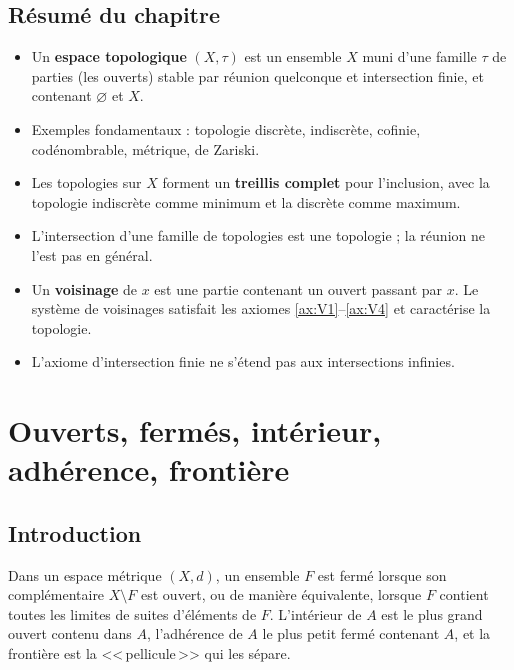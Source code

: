 \documentclass[12pt,a4paper,openany]{book}
\theoremstyle{definition}
\theoremstyle{cours}
\theoremstyle{coursnormal}
\begin{document}
\section*{Résumé du chapitre}

\begin{itemize}
  \item Un \textbf{espace topologique} $(X,\tau)$ est un ensemble $X$ muni d'une famille $\tau$ de parties (les ouverts) stable par réunion quelconque et intersection finie, et contenant $\varnothing$ et $X$.
  \item Exemples fondamentaux : topologie discrète, indiscrète, cofinie, codénombrable, métrique, de Zariski.
  \item Les topologies sur $X$ forment un \textbf{treillis complet} pour l'inclusion, avec la topologie indiscrète comme minimum et la discrète comme maximum.
  \item L'intersection d'une famille de topologies est une topologie ; la réunion ne l'est pas en général.
  \item Un \textbf{voisinage} de $x$ est une partie contenant un ouvert passant par $x$. Le système de voisinages satisfait les axiomes \ref{ax:V1}--\ref{ax:V4} et caractérise la topologie.
  \item L'axiome d'intersection finie ne s'étend pas aux intersections infinies.
\end{itemize}

\chapter{Ouverts, fermés, intérieur, adhérence, frontière}
\label{chap:ouverts-fermes}

\section*{Introduction}

Dans un espace métrique $(X,d)$, un ensemble $F$ est fermé lorsque son complémentaire $X \setminus F$ est ouvert, ou de manière équivalente, lorsque $F$ contient toutes les limites de suites d'éléments de $F$. L'intérieur de $A$ est le plus grand ouvert contenu dans $A$, l'adhérence de $A$ le plus petit fermé contenant $A$, et la frontière est la <<\,pellicule\,>> qui les sépare.
\end{document}
